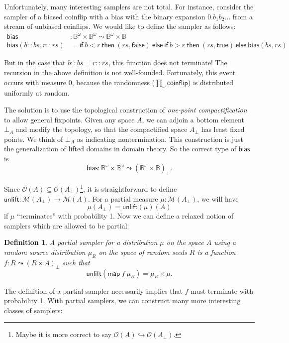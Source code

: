 \documentclass{article}           %
\newtheorem{definition}{Definition}
\newcommand{\Dist}[1]{\mathcal{M}({#1})}
\newcommand{\Open}[1]{\mathcal{O}({#1})}
\newcommand{\coinflip}{\mathsf{coinflip}}
\newcommand{\bool}{\mathbb{B}}
\newcommand{\cons}{::}
\begin{document}
Unfortunately, many interesting samplers are not total. For instance, consider the sampler of a biased coinflip with a bias with the binary expansion $0.b_1 b_2 \ldots$ from a stream of unbiased coinflips. We would like to define the sampler as follows:
\begin{align*}
\mathsf{bias} &: \bool^\omega \times \bool^\omega \leadsto \bool^\omega \times \bool
\\ \mathsf{bias}(b \cons bs, r \cons rs) &= \mathsf{if}\ b < r\ \mathsf{then}\ (rs, \mathsf{false})
  \ \mathsf{else}\ \mathsf{if}\ b > r\ \mathsf{then}\ (rs, \mathsf{true})\ \mathsf{else}\ \mathsf{bias}(bs, rs)
\end{align*}

But in the case that $b \cons bs = r \cons rs$, this function does not terminate! The recursion in the above definition is not well-founded. Fortunately, this event occurs with measure 0, because the randomness ($\prod_\omega \coinflip$) is distributed uniformly at random.

The solution is to use the topological construction of \emph{one-point compactification} to allow general fixpoints. Given any space $A$, we can adjoin a bottom element $\bot_A$ and modify the topology, so that the compactified space $A_\bot$ has least fixed points. We think of $\bot_A$ as indicating nontermination. This construction is just the generalization of lifted domains in domain theory. So the correct type of $\mathsf{bias}$ is
\[
\mathsf{bias} : \bool^\omega \times \bool^\omega \leadsto \left( \bool^\omega \times \bool \right)_\bot.
\]

Since $\Open{A} \subseteq \Open{A_\bot}$\footnote{Maybe it is more correct to say $\Open{A} \hookrightarrow \Open{A_\bot}$.}, it is straightforward to define $\mathsf{unlift} : \Dist{A_\bot} \to \Dist{A}$. For a partial measure $\mu : \Dist{A_\bot}$, we will have
\[
\mu(A_\bot) = \mathsf{unlift}(\mu)(A)
\]
if $\mu$ ``terminates'' with probability 1. Now we can define a relaxed notion of samplers which are allowed to be partial:

\begin{definition}
A \emph{partial sampler} for a distribution $\mu$ on the space $A$ using a random source distribution $\mu_R$ on the space of random seeds $R$ is a function $ f : R \leadsto \left(R \times A \right)_\bot$ such that
\[
 \mathsf{unlift}\left(\mathsf{map}\ f \ \mu_R\right) = \mu_R \times \mu.
\]
\end{definition}

The definition of a partial sampler necessarily implies that $f$ must terminate with probability 1. With partial samplers, we can construct many more interesting classes of samplers:
\end{document}
